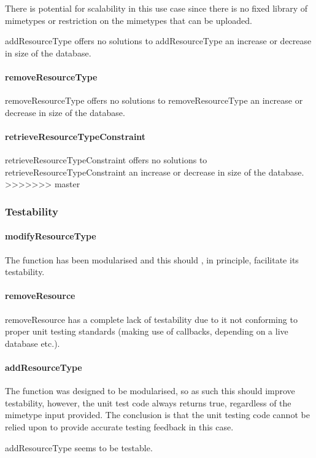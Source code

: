 \documentclass[a4paper]{article}
\begin{document}
There is potential for scalability in this use case since there is no fixed library of mimetypes or restriction on the mimetypes that can be uploaded.

addResourceType offers no solutions to addResourceType an increase or decrease in size of the database.

\paragraph{removeResourceType}
removeResourceType offers no solutions to removeResourceType an increase or decrease in size of the database.

\paragraph{retrieveResourceTypeConstraint}
retrieveResourceTypeConstraint offers no solutions to retrieveResourceTypeConstraint an increase or decrease in size of the database.
>>>>>>> master

\subsubsection {Testability}

\paragraph{modifyResourceType}
The function has been modularised and this should , in principle, facilitate its testability.

\paragraph{removeResource}
removeResource has a complete lack of testability due to it not conforming to proper unit testing standards (making use of callbacks, depending on a live database etc.).

\paragraph{addResourceType}

The function was designed to be modularised, so as such this should improve testability, 
however, the unit test code always returns true, regardless of the mimetype input provided. 
The conclusion is that the unit testing code cannot be relied upon to provide accurate testing 
feedback in this case.

addResourceType seems to be testable.
\end{document}
